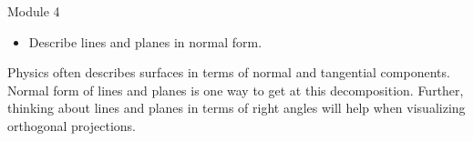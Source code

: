 \begin{lesson}

	Module 4

	\begin{itemize}
		\item Describe lines and planes in normal form.
	\end{itemize}

	Physics often describes surfaces in terms of normal and tangential components.
	Normal form of lines and planes is one way to get at this decomposition. Further, thinking
	about lines and planes in terms of right angles will help when visualizing orthogonal projections.

\end{lesson}

